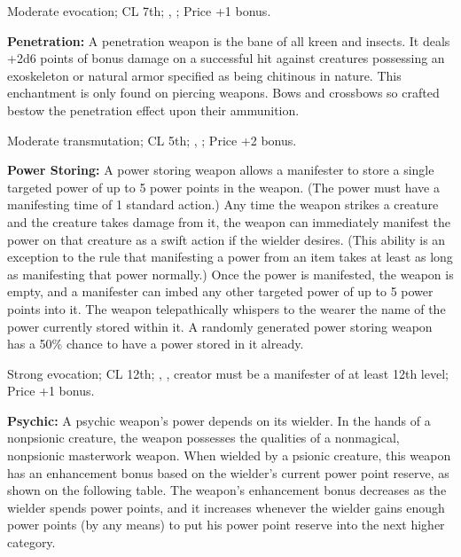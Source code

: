 Moderate evocation; CL 7th; , ; Price +1 bonus.


\textbf{Penetration:} A penetration weapon is the bane of all kreen and insects. It deals +2d6 points of bonus damage on a successful hit against creatures possessing an exoskeleton or natural armor specified as being chitinous in nature. This enchantment is only found on piercing weapons. Bows and crossbows so crafted bestow the penetration effect upon their ammunition.

Moderate transmutation; CL 5th; , ; Price +2 bonus.


\textbf{Power Storing:} A power storing weapon allows a manifester to store a single targeted power of up to 5 power points in the weapon. (The power must have a manifesting time of 1 standard action.) Any time the weapon strikes a creature and the creature takes damage from it, the weapon can immediately manifest the power on that creature as a swift action if the wielder desires. (This ability is an exception to the rule that manifesting a power from an item takes at least as long as manifesting that power normally.) Once the power is manifested, the weapon is empty, and a manifester can imbed any other targeted power of up to 5 power points into it. The weapon telepathically whispers to the wearer the name of the power currently stored within it. A randomly generated power storing weapon has a 50\% chance to have a power stored in it already.

Strong evocation; CL 12th; , , creator must be a manifester of at least 12th level; Price +1 bonus.


\textbf{Psychic:} A psychic weapon's power depends on its wielder. In the hands of a nonpsionic creature, the weapon possesses the qualities of a nonmagical, nonpsionic masterwork weapon. When wielded by a psionic creature, this weapon has an enhancement bonus based on the wielder's current power point reserve, as shown on the following table. The weapon's enhancement bonus decreases as the wielder spends power points, and it increases whenever the wielder gains enough power points (by any means) to put his power point reserve into the next higher category.


